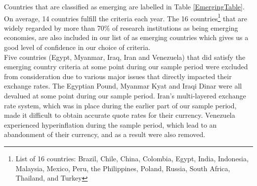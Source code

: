 \documentclass{article}
\begin{document}
Countries that are classified as emerging are labelled in Table \ref{EmergingTable}. On average, 14 countries fulfill the criteria each year. The 16 countries\footnote{List of 16 countries: Brazil, Chile, China, Colombia, Egypt, India, Indonesia, Malaysia, Mexico, Peru, the Philippines, Poland, Russia, South Africa, Thailand, and Turkey} that are widely regarded by more than 70\% of research institutions as being emerging economies, are also included in our list of as emerging countries which gives us a good level of confidence in our choice of criteria. \\

Five countries (Egypt, Myanmar, Iraq, Iran and Venezuela) that did satisfy the emerging country criteria at some point during our sample period were excluded from consideration due to various major issues that directly impacted their exchange rates. The Egyptian Pound, Myanmar Kyat and Iraqi Dinar were all devalued at some point during our sample period. Iran's multi-layered exchange rate system, which was in place during the earlier part of our sample period, made it difficult to obtain accurate quote rates for their currency. Venezuela experienced hyperinflation during the sample period, which lead to an abandonment of their currency, and as a result were also removed.
\end{document}
